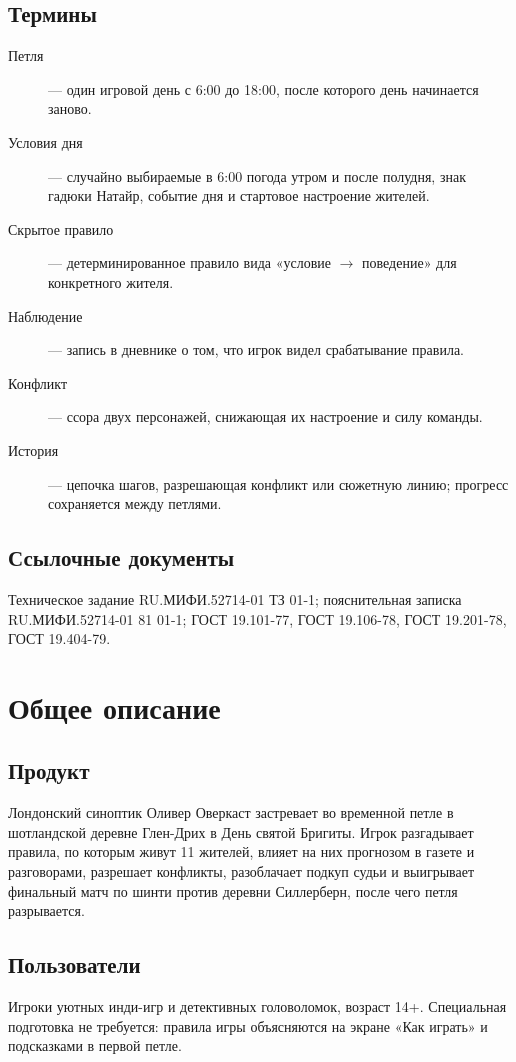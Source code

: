 \documentclass[12pt]{article}
\begin{document}
\subsection{Термины}
\begin{description}
\item[Петля] — один игровой день с 6:00 до 18:00, после которого день начинается заново.
\item[Условия дня] — случайно выбираемые в 6:00 погода утром и после полудня, знак гадюки Натайр, событие дня и стартовое настроение жителей.
\item[Скрытое правило] — детерминированное правило вида «условие $\rightarrow$ поведение» для конкретного жителя.
\item[Наблюдение] — запись в дневнике о том, что игрок видел срабатывание правила.
\item[Конфликт] — ссора двух персонажей, снижающая их настроение и силу команды.
\item[История] — цепочка шагов, разрешающая конфликт или сюжетную линию; прогресс сохраняется между петлями.
\end{description}

\subsection{Ссылочные документы}
Техническое задание RU.МИФИ.52714-01 ТЗ 01-1; пояснительная записка RU.МИФИ.52714-01 81 01-1; ГОСТ 19.101-77, ГОСТ 19.106-78, ГОСТ 19.201-78, ГОСТ 19.404-79.

\section{Общее описание}
\subsection{Продукт}
Лондонский синоптик Оливер Оверкаст застревает во временной петле в шотландской деревне Глен-Дрих в День святой Бригиты. Игрок разгадывает правила, по которым живут 11 жителей, влияет на них прогнозом в газете и разговорами, разрешает конфликты, разоблачает подкуп судьи и выигрывает финальный матч по шинти против деревни Силлерберн, после чего петля разрывается.

\subsection{Пользователи}
Игроки уютных инди-игр и детективных головоломок, возраст 14+. Специальная подготовка не требуется: правила игры объясняются на экране «Как играть» и подсказками в первой петле.
\end{document}
